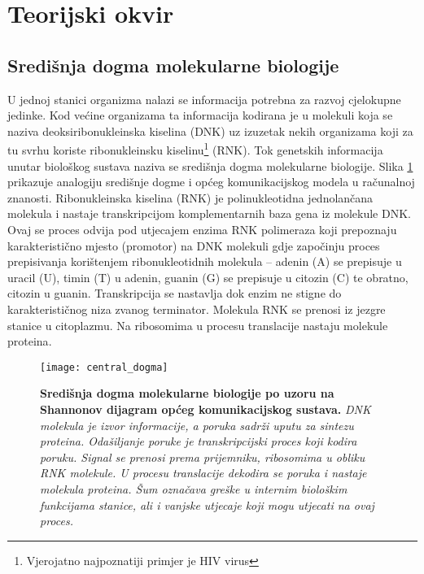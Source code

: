 \section{Teorijski okvir}
\label{ch:ch1}

\subsection{Središnja dogma molekularne biologije}

U jednoj stanici organizma nalazi se informacija potrebna za razvoj cjelokupne jedinke. Kod većine organizama ta informacija kodirana je u molekuli koja se naziva deoksiribonukleinska kiselina  (DNK) uz izuzetak nekih organizama koji za tu svrhu koriste ribonukleinsku kiselinu\footnote{Vjerojatno najpoznatiji primjer je HIV virus} (RNK).
Tok genetskih informacija unutar biološkog sustava naziva se središnja dogma molekularne biologije. Slika \ref{fig:dogma} prikazuje analogiju središnje dogme i općeg komunikacijskog modela u računalnoj znanosti. Ribonukleinska kiselina (RNK) je polinukleotidna jednolančana molekula i nastaje transkripcijom komplementarnih baza gena iz molekule DNK. Ovaj se proces odvija pod utjecajem enzima RNK polimeraza koji prepoznaju karakteristično mjesto (promotor) na DNK molekuli gdje započinju proces prepisivanja korištenjem ribonukleotidnih molekula – adenin (A) se prepisuje u uracil (U), timin (T) u adenin, guanin (G) se prepisuje u citozin (C) te obratno, citozin u guanin. Transkripcija se nastavlja dok enzim ne stigne do karakterističnog niza zvanog terminator. Molekula RNK se prenosi iz jezgre stanice u citoplazmu. Na ribosomima u procesu translacije nastaju molekule proteina\cite{Brown01}.
\par
\begin{center}
   \begin{figure}[ht!]
      \begin{center}
         \texttt{[image: central\_dogma]}
                 \caption[Središnja dogma molekularne biologije]{\textbf{Središnja dogma molekularne biologije po uzoru na Shannonov \cite{Shannon01} dijagram općeg komunikacijskog sustava.} \textit{DNK molekula je izvor informacije, a poruka sadrži uputu za sintezu proteina. Odašiljanje poruke je transkripcijski proces koji kodira poruku. Signal se prenosi prema prijemniku, ribosomima u obliku RNK molekule. U procesu translacije dekodira se poruka i nastaje molekula proteina. Šum označava greške u internim biološkim funkcijama stanice, ali i vanjske utjecaje koji mogu utjecati na ovaj proces.}}
         \label{fig:dogma}
      \end{center}
   \end{figure}
\end{center}

